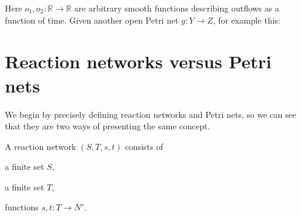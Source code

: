 \documentclass[]{compositionalityarticle}
\begin{document}
Here $o_1, o_2 : \mathbb{R} \rightarrow \mathbb{R}$ are arbitrary smooth functions describing outflows as a
function of time.
Given another open Petri net $g : Y \rightarrow Z$, for example this:


\section{Reaction networks versus Petri nets}
We begin by precisely defining reaction networks and Petri nets, so we can see
that they are two ways of presenting the same concept.
\begin{definition} A reaction network $(S, T, s, t)$ consists of
  \item a finite set $S$,
  \item a finite set $T$,
  \item functions $s, t: T \rightarrow N^{s}$.
\end{definition}





\end{document}
